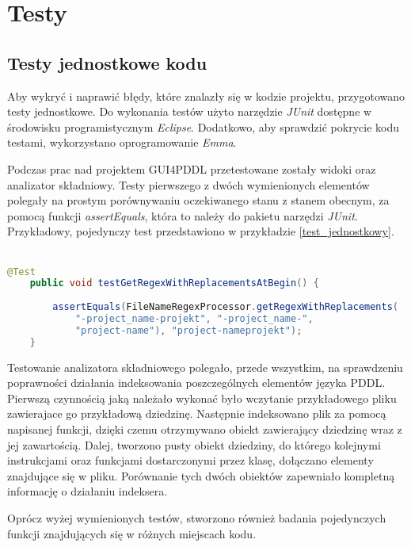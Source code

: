 \chapter{Testy}
\section{Testy jednostkowe kodu}

Aby wykryć i naprawić błędy, które znalazły się w kodzie projektu, przygotowano testy jednostkowe. Do wykonania testów użyto narzędzie \textit{JUnit }dostępne w środowisku programistycznym \textit{Eclipse}. Dodatkowo, aby sprawdzić pokrycie kodu testami, wykorzystano oprogramowanie \textit{Emma}.

Podczas prac nad projektem GUI4PDDL przetestowane zostały widoki oraz analizator składniowy. Testy pierwszego z dwóch wymienionych elementów polegały na prostym porównywaniu oczekiwanego stanu z stanem obecnym, za pomocą funkcji \textit{assertEquals}, która to należy do pakietu narzędzi \textit{JUnit}. Przykładowy, pojedynczy test przedstawiono w przykładzie \ref{test_jednostkowy}.\\\\
\begin{Code}
\begin{lstlisting}[language=JAVA,frame=single,label={test_jednostkowy}, caption={Przykładowy test jedostkowy}]
	@Test
	public void testGetRegexWithReplacementsAtBegin() {
		
		assertEquals(FileNameRegexProcessor.getRegexWithReplacements(
			"-project_name-projekt", "-project_name-", 
			"project-name"), "project-nameprojekt");
	}
\end{lstlisting}
\end{Code}


Testowanie analizatora składniowego polegało, przede wszystkim, na sprawdzeniu poprawności działania indeksowania poszczególnych elementów języka PDDL. Pierwszą czynnością jaką należało wykonać było wczytanie przykładowego pliku zawierajace go przykładową dziedzinę. Następnie indeksowano plik za pomocą napisanej funkcji, dzięki czemu otrzymywano obiekt zawierający dziedzinę wraz z jej zawartością. Dalej, tworzono pusty obiekt dziedziny, do którego kolejnymi instrukcjami oraz funkcjami dostarczonymi przez klasę, dołączano elementy znajdujące się w pliku. Porównanie tych dwóch obiektów zapewniało kompletną informację o działaniu indeksera.

Oprócz wyżej wymienionych testów, stworzono również badania pojedynczych funkcji znajdujących się w różnych miejscach kodu.

